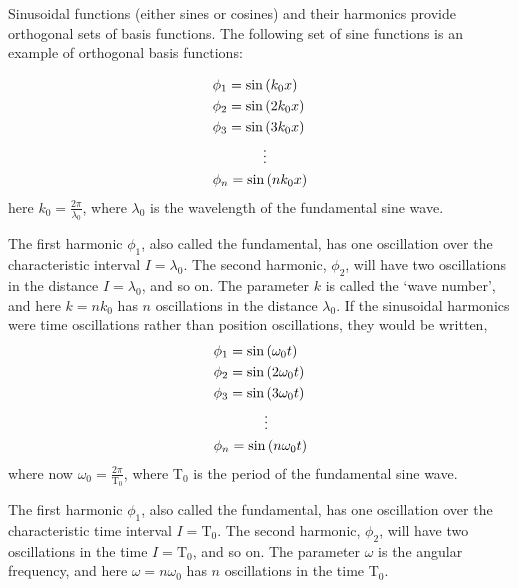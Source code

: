 \documentclass[12pt]{article}
\begin{document}
\begin{flushleft}
Sinusoidal functions (either sines or cosines) and their harmonics provide orthogonal sets of basis functions.  The following set of sine functions is an example of orthogonal basis functions:

\begin{equation*}
\begin{aligned}
& \phi_{1} = \sin{(k_{0}x)} \\
& \phi_{2} = \sin{(2k_{0}x)} \\
& \phi_{3} = \sin{(3k_{0}x)} \\
& \hspace{.5in} \vdots \\
&\phi_{n} = \sin{(nk_{0}x)} \\
\end{aligned}
\end{equation*}
here $k_{0}=\frac{2\pi}{\lambda_{0}}$, where $\lambda_{0}$ is the wavelength of the fundamental sine wave.  

The first harmonic $\phi_{1}$, also called the fundamental, has one oscillation over the characteristic interval $I=\lambda_{0}$.  The second harmonic, $\phi_{2}$, will have two oscillations in the distance $I=\lambda_{0}$, and so on.  The parameter $k$ is called the `wave number', and here $k=nk_{0}$  has $n$ oscillations in the distance $\lambda_{0}$.  If the sinusoidal harmonics were time oscillations rather than position oscillations, they would be written,
\begin{equation*}
\begin{aligned}
& \phi_{1} = \sin{(\omega_{0}t)} \\
& \phi_{2} = \sin{(2\omega_{0}t)} \\
& \phi_{3} = \sin{(3\omega_{0}t)} \\
& \hspace{.5in} \vdots \\
&\phi_{n} = \sin{(n\omega_{0}t)} \\
\end{aligned}
\end{equation*}
where now $\omega_{0}=\frac{2\pi}{\text{T}_{0}}$, where T$_{0}$ is the period of the fundamental sine wave.

The first harmonic $\phi_{1}$, also called the fundamental, has one oscillation over the characteristic time  interval $I=\text{T}_{0}$.  The second harmonic, $\phi_{2}$, will have two oscillations in the time $I=\text{T}_{0}$, and so on.  The parameter $\omega$ is the angular frequency, and here $\omega=n\omega_{0}$  has $n$ oscillations in the time T$_{0}$.


\end{flushleft}
\end{document}
